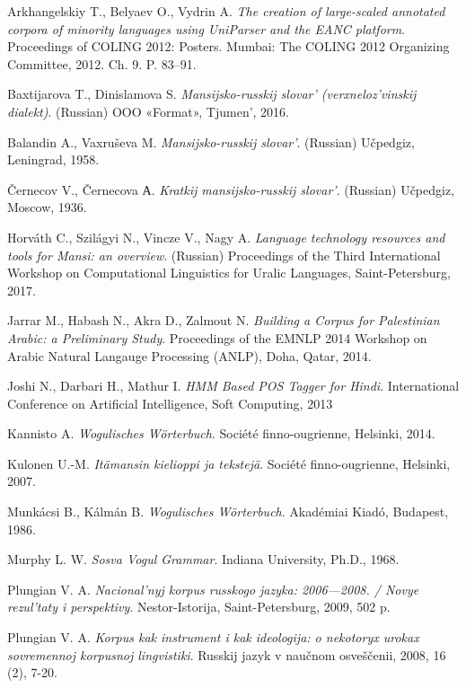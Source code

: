 \documentclass[b5paper,notitlepage]{article}
\begin{document}
\begin{thebibliography}{9}
Arkhangelskiy T., Belyaev O., Vydrin A. 
\textit{The creation of large-scaled annotated corpora of minority languages using UniParser and the EANC platform}. 
Proceedings of COLING 2012: Posters. Mumbai: The COLING 2012 Organizing Committee, 2012. Ch. 9. P. 83–91.

Baxtijarova T., Dinislamova S. 
\textit{Mansijsko-russkij slovar’ (verxneloz’vinskij dialekt)}. (Russian) 
OOO «Format», Tjumen’, 2016.

Balandin A., Vaxruševa M.
\textit{Mansijsko-russkij slovar’}. (Russian) 
Učpedgiz, Leningrad, 1958.

Černecov V., Černecova А.
\textit{Kratkij mansijsko-russkij slovar’}. (Russian) 
Učpedgiz, Moscow, 1936.

Horváth C., Szilágyi N., Vincze V., Nagy A.
\textit{Language technology resources and tools for Mansi: an overview}. (Russian) 
Proceedings of the Third International Workshop on Computational Linguistics for Uralic Languages, Saint-Petersburg, 2017.

Jarrar M., Habash N., Akra D., Zalmout N. 
\textit{Building a Corpus for Palestinian Arabic: a Preliminary Study}.
Proceedings of the EMNLP 2014 Workshop on Arabic Natural Langauge Processing (ANLP), Doha, Qatar, 2014. 

Joshi N., Darbari H., Mathur I. 
\textit{HMM Based POS Tagger for Hindi}.
International Conference on Artificial Intelligence, Soft Computing, 2013

Kannisto A. 
\textit{Wogulisches Wörterbuch}.
Société finno-ougrienne, Helsinki, 2014.

Kulonen U.-M. 
\textit{Itämansin kielioppi ja tekstejä}.
Société finno-ougrienne, Helsinki, 2007.

Munkácsi B., Kálmán B. 
\textit{Wogulisches Wörterbuch}.
Akadémiai Kiadó, Budapest, 1986.

Murphy L. W.  
\textit{Sosva Vogul Grammar}.
Indiana University, Ph.D., 1968.

Plungian V. A. 
\textit{Nacional’nyj korpus russkogo jazyka: 2006—2008. / Novye rezul’taty i perspektivy}.
Nestor-Istorija, Saint-Petersburg, 2009, 502 p.

Plungian V. A. 
\textit{Korpus kak instrument i kak ideologija: o nekotoryx urokax sovremennoj korpusnoj lingvistiki}.
Russkij jazyk v naučnom osveščenii, 2008, 16 (2), 7-20.


\end{thebibliography}
\end{document}
